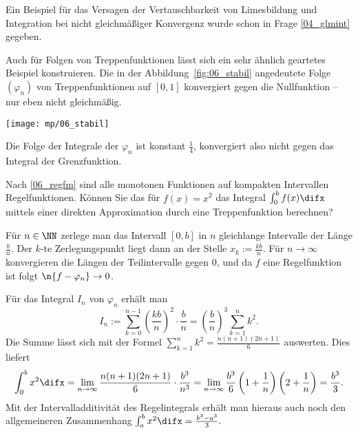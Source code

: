 \begin{antwort}
Ein Beispiel für das Versagen der Vertauschbarkeit von Limesbildung 
und Integration bei 
nicht gleichmäßiger Konvergenz wurde schon in Frage 
\ref{04_glmint} gegeben. 

Auch für Folgen von Treppenfunktionen lässt sich ein sehr ähnlich 
geartetes Beispiel konstruieren. Die in der Abbildung~\ref{fig:06_stabil} 
angedeutete Folge $(\varphi_n)$ von Treppenfunktionen auf $[0,1]$ 
konvergiert gegen die Nullfunktion -- nur eben nicht gleichmäßig. 

\begin{center}
  \texttt{[image: mp/06\_stabil]}
  \label{fig:06_stabil}
\end{center}

Die Folge der Integrale der $\varphi_n$ ist konstant $\frac{1}{4}$, 
konvergiert also nicht gegen das Integral der Grenzfunktion.
\AntEnd
\end{antwort}

\begin{frage}
Nach \ref{06_regfm} sind alle monotonen Funktionen auf kompakten Intervallen 
Regelfunktionen. 
Können Sie das für $f(x)=x^2$ das Integral 
$\int_0^b f(x) \difx$
mittels einer direkten Approximation durch eine Treppenfunktion berechnen? 
\end{frage}

\begin{antwort}
Für $n\in \NN$ zerlege man das Intervall $[0,b]$ in $n$ gleichlange 
Intervalle der Länge $ \frac{b}{n}$. Der $k$-te Zerlegungspunkt 
liegt dann an der Stelle $x_k:=\frac{kb}{n}$. Für $n\to\infty$ konvergieren  
die Längen der Teilintervalle gegen $0$, und da $f$ eine Regelfunktion 
ist folgt $\n{ f-\varphi_n }\to 0$.  

Für das Integral $I_n$ von $\varphi_n$ erhält man 
\[
I_n := \sum_{k=0}^{n-1} \left( \frac{kb}{n} \right)^2 \cdot \frac{b}{n} =
\left(\frac{b}{n}\right)^3 \sum_{k=1}^n k^2.
\]
Die Summe lässt sich mit der Formel 
$\sum_{k=1}^n k^2 = \frac{n(n+1)(2n+1)}{6}$ auswerten. Dies liefert
\[
\int_0^b x^2 \difx = 
\lim_{n\to\infty}\frac{ n(n+1)(2n+1) }{ 6 } \cdot \frac{b^3}{n^3} = 
\lim_{n\to\infty}
\frac{b^3}{6} \left( 1+\frac{1}{n} \right) \left( 2+\frac{1}{n} \right)
=\frac{b^3}{3}.
\]
Mit der Intervalladditivität des Regelintegrals erhält man hieraus auch 
noch den allgemeineren Zusammenhang
$
\int_a^b x^2 \difx = \frac{b^3-a^3}{3}.
$\AntEnd
\end{antwort}

